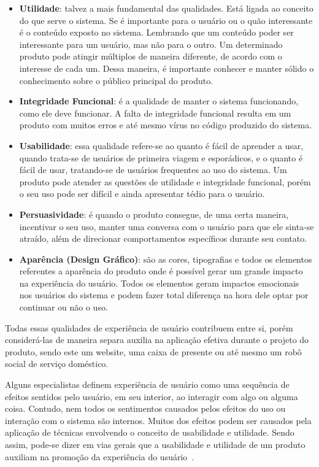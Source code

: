 \begin{itemize}
    \item \textbf{Utilidade}: talvez a mais fundamental das qualidades. Está ligada ao conceito do que serve o sistema. Se é importante para o usuário ou o quão interessante é o conteúdo exposto no sistema. Lembrando que um conteúdo poder ser interessante para um usuário, mas não para o outro. Um determinado produto pode atingir múltiplos de maneira diferente, de acordo com o interesse de cada um. Dessa maneira, é importante conhecer e manter sólido o conhecimento sobre o público principal do produto.
    \item \textbf{Integridade Funcional}: é a qualidade de manter o sistema funcionando, como ele deve funcionar. A falta de integridade funcional resulta em um produto com muitos erros e até mesmo vírus no código produzido do sistema.
    \item \textbf{Usabilidade}: essa qualidade refere-se ao quanto é fácil de aprender a usar, quando trata-se de usuários de primeira viagem e esporádicos, e o quanto é fácil de usar, tratando-se de usuários frequentes ao uso do sistema. Um produto pode atender as questões de utilidade e integridade funcional, porém o seu uso pode ser difícil e ainda apresentar tédio para o usuário.
    \item \textbf{Persuasividade}: é quando o produto consegue, de uma certa maneira, incentivar o seu uso, manter uma conversa com o usuário para que ele sinta-se atraído, além de direcionar comportamentos específicos durante seu contato.
    \item \textbf{Aparência (Design Gráfico)}: são as cores, tipografias e todos os elementos referentes a aparência do produto onde é possível gerar um grande impacto na experiência do usuário. Todos os elementos geram impactos emocionais nos usuários do sistema e podem fazer total diferença na hora dele optar por continuar ou não o uso.
\end{itemize}

Todas essas qualidades de experiência de usuário contribuem entre si, porém considerá-las de maneira separa auxilia na aplicação efetiva durante o projeto do produto, sendo este um website, uma caixa de presente ou até mesmo um robô social de serviço doméstico.

Alguns especialistas definem experiência de usuário como uma sequência de efeitos sentidos pelo usuário, em seu interior, ao interagir com algo ou alguma coisa. Contudo, nem todos os sentimentos causados pelos efeitos do uso ou interação com o sistema são internos. Muitos dos efeitos podem ser causados pela aplicação de técnicas envolvendo o conceito de usabilidade e utilidade. Sendo assim, pode-se dizer em vias gerais que a usabilidade e utilidade de um produto auxiliam na promoção da experiência do usuário~\cite{hartson:2012}.

